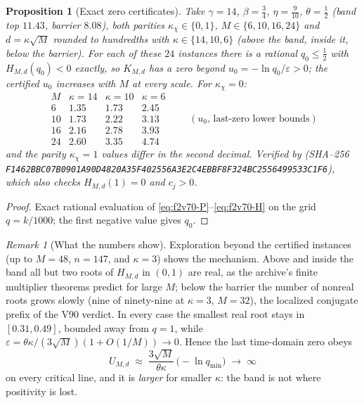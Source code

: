 \documentclass[11pt]{article}
\newtheorem{proposition}[theorem]{Proposition}
\theoremstyle{definition}
\theoremstyle{remark}
\newtheorem{remark}[theorem]{Remark}
\begin{document}
\begin{proposition}[Exact zero certificates]
\label{prop:f2v70-certificates}
Take \(\gamma=14\), \(\beta=\tfrac34\), \(\eta=\tfrac9{10}\),
\(\theta=\tfrac12\) (band top \(11.43\), barrier \(8.08\)), both parities
\(\kappa_\chi\in\{0,1\}\), \(M\in\{6,10,16,24\}\) and
\(d=\kappa\sqrt M\) rounded to hundredths with \(\kappa\in\{14,10,6\}\)
(above the band, inside it, below the barrier).  For each of these
\(24\) instances there is a rational \(q_0\le\tfrac12\) with
\(H_{M,d}(q_0)<0\) exactly, so \(K_{M,d}\) has a zero beyond
\(u_0=-\ln q_0/\varepsilon>0\); the certified \(u_0\) increases with
\(M\) at every scale.  For \(\kappa_\chi=0\):
\begin{equation}
\begin{array}{c|ccc}
 M & \kappa=14 & \kappa=10 & \kappa=6\\ \hline
 6  & 1.35 & 1.73 & 2.45\\
 10 & 1.73 & 2.22 & 3.13\\
 16 & 2.16 & 2.78 & 3.93\\
 24 & 2.60 & 3.35 & 4.74
\end{array}
\qquad(u_0\text{, last-zero lower bounds})
\label{eq:f2v70-table}
\end{equation}
and the parity \(\kappa_\chi=1\) values differ in the second decimal.
Verified by 
(SHA--256 \texttt{F1462BBC07B0901A90D4820A35F40255}\allowbreak\texttt{6A3E2C4EBBF8F324BC2556499533C1F6}), which also checks
\(H_{M,d}(1)=0\) and \(c_j>0\).
\end{proposition}

\begin{proof}
Exact rational evaluation of \eqref{eq:f2v70-P}--\eqref{eq:f2v70-H} on the
grid \(q=k/1000\); the first negative value gives \(q_0\).
\end{proof}

\begin{remark}[What the numbers show]
\label{rem:f2v70-growth}
Exploration beyond the certified instances (up to \(M=48\), \(n=147\),
and \(\kappa=3\)) shows the mechanism.  Above and inside the band all but
two roots of \(H_{M,d}\) in \((0,1)\) are real, as the archive's finite
multiplier theorems predict for large \(M\); below the barrier the
number of nonreal roots grows slowly (nine of ninety-nine at \(\kappa=3\),
\(M=32\)), the localized conjugate prefix of the V90 verdict.  In every
case the smallest real root stays in \([0.31,0.49]\), bounded away from
\(q=1\), while \(\varepsilon=\theta\kappa/(3\sqrt M)(1+O(1/M))\to0\).
Hence the last time-domain zero obeys
\begin{equation}
 U_{M,d}\;\approx\;\frac{3\sqrt M}{\theta\kappa}\,\bigl(-\ln q_{\min}\bigr)
 \;\longrightarrow\;\infty
 \label{eq:f2v70-U}
\end{equation}
on every critical line, and it is \emph{larger} for smaller \(\kappa\):
the band is not where positivity is lost.
\end{remark}
\end{document}
